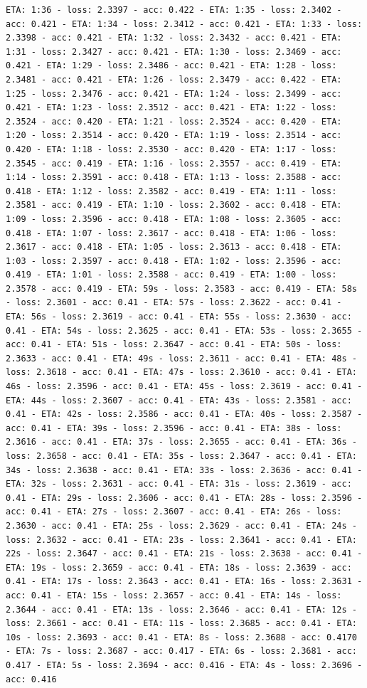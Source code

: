 \documentclass[11pt]{article}
\begin{document}
\begin{Verbatim}[commandchars=\\\{\}]
ETA: 1:36 - loss: 2.3397 - acc: 0.422 - ETA: 1:35 - loss: 2.3402 - acc: 0.421 - ETA: 1:34 - loss: 2.3412 - acc: 0.421 - ETA: 1:33 - loss: 2.3398 - acc: 0.421 - ETA: 1:32 - loss: 2.3432 - acc: 0.421 - ETA: 1:31 - loss: 2.3427 - acc: 0.421 - ETA: 1:30 - loss: 2.3469 - acc: 0.421 - ETA: 1:29 - loss: 2.3486 - acc: 0.421 - ETA: 1:28 - loss: 2.3481 - acc: 0.421 - ETA: 1:26 - loss: 2.3479 - acc: 0.422 - ETA: 1:25 - loss: 2.3476 - acc: 0.421 - ETA: 1:24 - loss: 2.3499 - acc: 0.421 - ETA: 1:23 - loss: 2.3512 - acc: 0.421 - ETA: 1:22 - loss: 2.3524 - acc: 0.420 - ETA: 1:21 - loss: 2.3524 - acc: 0.420 - ETA: 1:20 - loss: 2.3514 - acc: 0.420 - ETA: 1:19 - loss: 2.3514 - acc: 0.420 - ETA: 1:18 - loss: 2.3530 - acc: 0.420 - ETA: 1:17 - loss: 2.3545 - acc: 0.419 - ETA: 1:16 - loss: 2.3557 - acc: 0.419 - ETA: 1:14 - loss: 2.3591 - acc: 0.418 - ETA: 1:13 - loss: 2.3588 - acc: 0.418 - ETA: 1:12 - loss: 2.3582 - acc: 0.419 - ETA: 1:11 - loss: 2.3581 - acc: 0.419 - ETA: 1:10 - loss: 2.3602 - acc: 0.418 - ETA: 1:09 - loss: 2.3596 - acc: 0.418 - ETA: 1:08 - loss: 2.3605 - acc: 0.418 - ETA: 1:07 - loss: 2.3617 - acc: 0.418 - ETA: 1:06 - loss: 2.3617 - acc: 0.418 - ETA: 1:05 - loss: 2.3613 - acc: 0.418 - ETA: 1:03 - loss: 2.3597 - acc: 0.418 - ETA: 1:02 - loss: 2.3596 - acc: 0.419 - ETA: 1:01 - loss: 2.3588 - acc: 0.419 - ETA: 1:00 - loss: 2.3578 - acc: 0.419 - ETA: 59s - loss: 2.3583 - acc: 0.419 - ETA: 58s - loss: 2.3601 - acc: 0.41 - ETA: 57s - loss: 2.3622 - acc: 0.41 - ETA: 56s - loss: 2.3619 - acc: 0.41 - ETA: 55s - loss: 2.3630 - acc: 0.41 - ETA: 54s - loss: 2.3625 - acc: 0.41 - ETA: 53s - loss: 2.3655 - acc: 0.41 - ETA: 51s - loss: 2.3647 - acc: 0.41 - ETA: 50s - loss: 2.3633 - acc: 0.41 - ETA: 49s - loss: 2.3611 - acc: 0.41 - ETA: 48s - loss: 2.3618 - acc: 0.41 - ETA: 47s - loss: 2.3610 - acc: 0.41 - ETA: 46s - loss: 2.3596 - acc: 0.41 - ETA: 45s - loss: 2.3619 - acc: 0.41 - ETA: 44s - loss: 2.3607 - acc: 0.41 - ETA: 43s - loss: 2.3581 - acc: 0.41 - ETA: 42s - loss: 2.3586 - acc: 0.41 - ETA: 40s - loss: 2.3587 - acc: 0.41 - ETA: 39s - loss: 2.3596 - acc: 0.41 - ETA: 38s - loss: 2.3616 - acc: 0.41 - ETA: 37s - loss: 2.3655 - acc: 0.41 - ETA: 36s - loss: 2.3658 - acc: 0.41 - ETA: 35s - loss: 2.3647 - acc: 0.41 - ETA: 34s - loss: 2.3638 - acc: 0.41 - ETA: 33s - loss: 2.3636 - acc: 0.41 - ETA: 32s - loss: 2.3631 - acc: 0.41 - ETA: 31s - loss: 2.3619 - acc: 0.41 - ETA: 29s - loss: 2.3606 - acc: 0.41 - ETA: 28s - loss: 2.3596 - acc: 0.41 - ETA: 27s - loss: 2.3607 - acc: 0.41 - ETA: 26s - loss: 2.3630 - acc: 0.41 - ETA: 25s - loss: 2.3629 - acc: 0.41 - ETA: 24s - loss: 2.3632 - acc: 0.41 - ETA: 23s - loss: 2.3641 - acc: 0.41 - ETA: 22s - loss: 2.3647 - acc: 0.41 - ETA: 21s - loss: 2.3638 - acc: 0.41 - ETA: 19s - loss: 2.3659 - acc: 0.41 - ETA: 18s - loss: 2.3639 - acc: 0.41 - ETA: 17s - loss: 2.3643 - acc: 0.41 - ETA: 16s - loss: 2.3631 - acc: 0.41 - ETA: 15s - loss: 2.3657 - acc: 0.41 - ETA: 14s - loss: 2.3644 - acc: 0.41 - ETA: 13s - loss: 2.3646 - acc: 0.41 - ETA: 12s - loss: 2.3661 - acc: 0.41 - ETA: 11s - loss: 2.3685 - acc: 0.41 - ETA: 10s - loss: 2.3693 - acc: 0.41 - ETA: 8s - loss: 2.3688 - acc: 0.4170 - ETA: 7s - loss: 2.3687 - acc: 0.417 - ETA: 6s - loss: 2.3681 - acc: 0.417 - ETA: 5s - loss: 2.3694 - acc: 0.416 - ETA: 4s - loss: 2.3696 - acc: 0.416 
\end{Verbatim}
\end{document}
